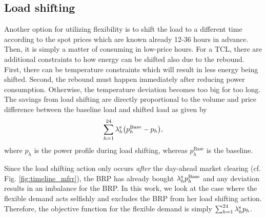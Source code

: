 \vspace{-2mm}
\subsection{Load shifting}
%
Another option for utilizing flexibility is to shift the load to a different time according to the spot prices which are known already 12-36 hours in advance. Then, it is simply a matter of consuming in low-price hours.
%
For a TCL, there are additional constraints to how energy can be shifted also due to the rebound. First, there can be temperature constraints which will result in less energy being shifted. Second, the rebound must happen immediately after reducing power consumption. Otherwise, the temperature deviation becomes too big for too long.
The savings from load shifting are directly proportional to the volume and price difference between the baseline load and shifted load as given by
%
\begin{equation}\label{eq:load_shifting_savings}
    \sum_{h=1}^{24} \lambda^{\rm{s}}_{h} \big(p^{\text{Base}}_{h} -  p_{h}\big),
\end{equation}
%
where $p_{h}$ is the power profile during load shifting, whereas $p^{\text{Base}}_{h}$ is the baseline.

Since the load shifting action only occurs \textit{after} the day-ahead market clearing (cf. Fig. \ref{fig:timeline_mfrr}), the BRP has already bought $\lambda^{\rm{s}}_{h} p^{\text{Base}}_{h}$ and any deviation results in an imbalance for the BRP. In this work, we look at the case where the flexible demand acts selfishly and excludes the BRP from her load shifting action. Therefore, the objective function for the flexible demand is simply $\sum_{h=1}^{24} \lambda_{h}^{\rm{s}} p_{h}$.

